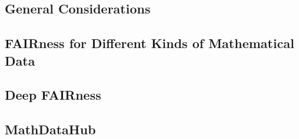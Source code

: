 

\subsection{General Considerations}
 

\subsection{FAIRness for Different Kinds of Mathematical Data}
 

\subsection{Deep FAIRness}\label{sec:deep}
 

\subsection{MathDataHub}\label{sec:hub}
 
